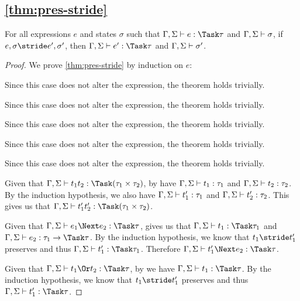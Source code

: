 \subsection{\cref{thm:pres-stride}}

\begin{lemma}
  For all expressions $e$ and states $\sigma$
  such that $\Gamma,\Sigma \infers e:\Task\tau$ and $\Gamma,\Sigma \vdash \sigma$,
  if $e,\sigma \stride e',\sigma'$,
  then $\Gamma,\Sigma \infers e':\Task\tau$ and $\Gamma,\Sigma \vdash \sigma'$.
  \label{thm:pres-stride}
\end{lemma}

\begin{proof}
  We prove \cref{thm:pres-stride} by induction on $e$:

     {Since this case does not alter the expression, the theorem holds trivially.}

     {Since this case does not alter the expression, the theorem holds trivially.}

     {Since this case does not alter the expression, the theorem holds trivially.}

     {Since this case does not alter the expression, the theorem holds trivially.}

     {Since this case does not alter the expression, the theorem holds trivially.}

     {Given that $\Gamma,\Sigma\infers t_1\And t_2:\Task(\tau_1\times\tau_2)$, by  have $\Gamma,\Sigma\vdash t_1:\tau_1$ and $\Gamma,\Sigma\vdash t_2:\tau_2$.
     By the induction hypothesis, we also have $\Gamma,\Sigma\vdash t_1':\tau_1$ and $\Gamma,\Sigma\vdash t_2':\tau_2$.
     This gives us that $\Gamma,\Sigma\infers t_1'\And t_2':\Task(\tau_1\times\tau_2)$.}

       {Given that
  $\Gamma,\Sigma\infers e_1\Next e_2:\Task \tau$,  gives us that $\Gamma,\Sigma\infers t_1:\Task\tau_1$ and
  $\Gamma,\Sigma\infers e_2:\tau_1 \to \Task \tau$. By the induction hypothesis,
  we know that $t_1\stride t_1'$ preserves and thus
  $\Gamma,\Sigma\infers t_1':\Task\tau_1$. Therefore
  $\Gamma,\Sigma\infers t_1'\Next e_2:\Task\tau$.}

       {Given that
  $\Gamma,\Sigma\infers t_1\Or t_2:\Task\tau$, by  we have
  $\Gamma,\Sigma\infers t_1:\Task\tau$. By the induction hypothesis, we know that
  $t_1\stride t_1'$ preserves and thus $\Gamma,\Sigma\infers t_1':\Task\tau$.}


\end{proof}
